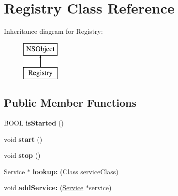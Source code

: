 \hypertarget{interface_registry}{
\section{\-Registry \-Class \-Reference}
\label{interface_registry}
}
\-Inheritance diagram for \-Registry\-:\begin{figure}[H]
\begin{center}
\leavevmode
\includegraphics[height=2.000000cm]{interface_registry}
\end{center}
\end{figure}
\subsection*{\-Public \-Member \-Functions}
\begin{DoxyCompactItemize}
\item 
\hypertarget{interface_registry_a9eadfdd03b5ac06e06350a38b45666f6}{
\-B\-O\-O\-L {\bfseries is\-Started} ()}
\label{interface_registry_a9eadfdd03b5ac06e06350a38b45666f6}

\item 
\hypertarget{interface_registry_add5d8bc56a289702c7199f3a7eb21046}{
void {\bfseries start} ()}
\label{interface_registry_add5d8bc56a289702c7199f3a7eb21046}

\item 
\hypertarget{interface_registry_addacc2224aa460a2572a2cd3f34b9d8e}{
void {\bfseries stop} ()}
\label{interface_registry_addacc2224aa460a2572a2cd3f34b9d8e}

\item 
\hypertarget{interface_registry_a4d2df3454428a85aab21df6bb9dd7ca3}{
\hyperlink{interface_service}{\-Service} $\ast$ {\bfseries lookup\-:} (\-Class service\-Class)}
\label{interface_registry_a4d2df3454428a85aab21df6bb9dd7ca3}

\item 
\hypertarget{interface_registry_a978978b4278b57e9f53bd51305d44dce}{
void {\bfseries add\-Service\-:} (\hyperlink{interface_service}{\-Service} $\ast$service)}
\label{interface_registry_a978978b4278b57e9f53bd51305d44dce}

\end{DoxyCompactItemize}
